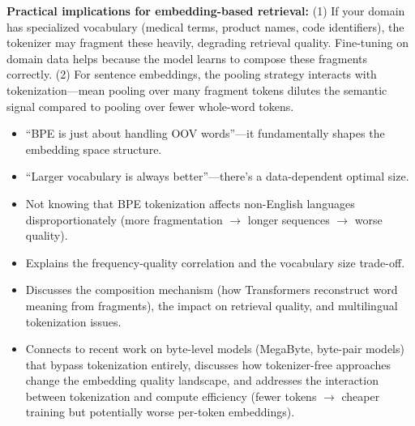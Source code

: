 \begin{interviewq}
\textbf{Practical implications for embedding-based retrieval:} (1) If your domain has specialized vocabulary (medical terms, product names, code identifiers), the tokenizer may fragment these heavily, degrading retrieval quality. Fine-tuning on domain data helps because the model learns to compose these fragments correctly. (2) For sentence embeddings, the pooling strategy interacts with tokenization---mean pooling over many fragment tokens dilutes the semantic signal compared to pooling over fewer whole-word tokens.

\redflags
\begin{itemize}
    \item ``BPE is just about handling OOV words''---it fundamentally shapes the embedding space structure.
    \item ``Larger vocabulary is always better''---there's a data-dependent optimal size.
    \item Not knowing that BPE tokenization affects non-English languages disproportionately (more fragmentation $\to$ longer sequences $\to$ worse quality).
\end{itemize}


\goodgreat
\begin{itemize}
    \item {} Explains the frequency-quality correlation and the vocabulary size trade-off.
    \item {} Discusses the composition mechanism (how Transformers reconstruct word meaning from fragments), the impact on retrieval quality, and multilingual tokenization issues.
    \item {} Connects to recent work on byte-level models (MegaByte, byte-pair models) that bypass tokenization entirely, discusses how tokenizer-free approaches change the embedding quality landscape, and addresses the interaction between tokenization and compute efficiency (fewer tokens $\to$ cheaper training but potentially worse per-token embeddings).
\end{itemize}

\end{interviewq}

